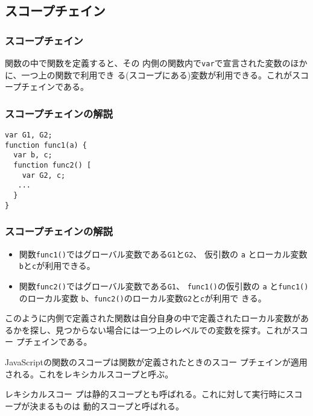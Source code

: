 \subsection{スコープチェイン}
\begin{frame}[containsverbatim]
\frametitle{スコープチェイン}
関数の中で関数を定義すると、その
内側の関数内で\Verb+var+で宣言された変数のほかに、一つ上の関数で利用でき
る(スコープにある)変数が利用できる。これがスコープチェインである。
\end{frame}
\begin{frame}[containsverbatim]
\frametitle{スコープチェインの解説}
\begin{Verbatim}
var G1, G2;
function func1(a) {
  var b, c;
  function func2() [
    var G2, c;
   ...
  }
}
\end{Verbatim}
\end{frame}
\begin{frame}[containsverbatim]
\frametitle{スコープチェインの解説}
\begin{itemize}
 \item 関数\Verb+func1()+ではグローバル変数である\Verb+G1+と\Verb+G2+、
       仮引数の \Verb+a+ とローカル変数\Verb+b+と\Verb+c+が利用できる。
 \item 関数\Verb+func2()+ではグローバル変数である\Verb+G1+、
       \Verb+func1()+の仮引数の \Verb+a+ と\Verb+func1()+のローカル変数
       \Verb+b+、\Verb+func2()+のローカル変数\Verb+G2+と\Verb+c+が利用で
       きる。
\end{itemize}
このように内側で定義された関数は自分自身の中で定義されたローカル変数があ
るかを探し、見つからない場合には一つ上のレベルでの変数を探す。これがスコー
プチェインである。

JavaScriptの関数のスコープは関数が定義されたときのスコー
プチェインが適用される。これをレキシカルスコープと呼ぶ。

レキシカルスコー
プは静的スコープとも呼ばれる。これに対して実行時にスコープが決まるものは
動的スコープと呼ばれる。
\end{frame}
